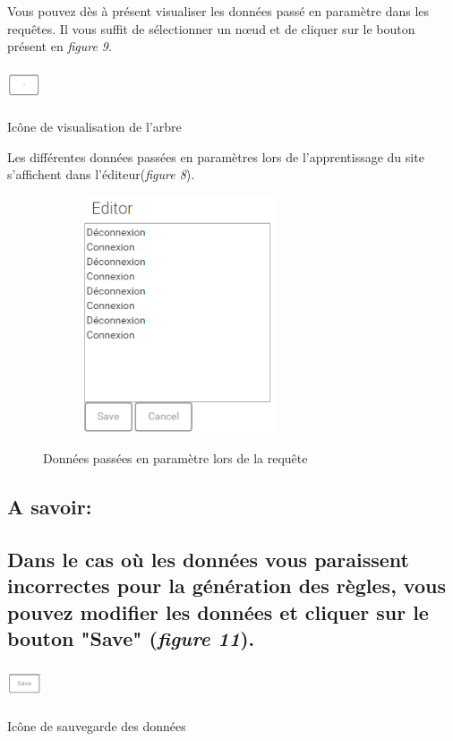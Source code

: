 \documentclass[a4paper,10pt,justified,openany]{tufte-book}
\begin{document}
Vous pouvez dès à présent visualiser les données passé en paramètre dans les requêtes.
Il vous suffit de sélectionner un nœud et de cliquer sur le bouton présent en {\itshape figure 9}.

\begin{marginfigure}
\includegraphics[width=1cm, height=1cm]{./images/visudonnees.png}
\label{iconevueapprentissage}
\caption{Icône de visualisation de l'arbre}
\end{marginfigure}

Les différentes données passées en paramètres lors de l'apprentissage du site  s'affichent dans l'éditeur({\itshape figure 8}).


\begin{figure}
\includegraphics[width=8cm, height=7cm]{./images/editeurvisu.png}
\label{iconevueapprentissage}
\caption{Données passées en paramètre lors de la requête}
\end{figure}


\subsection{A savoir:}

\subsection{Dans le cas où les données vous paraissent incorrectes pour la génération des règles, vous pouvez modifier les données et cliquer sur le bouton "Save" ({\itshape figure 11}).}

\begin{marginfigure}
\includegraphics[width=1cm, height=1cm]{./images/savedonnees.png}
\label{iconevueapprentissage}
\caption{Icône de sauvegarde des données}
\end{marginfigure}
\end{document}

